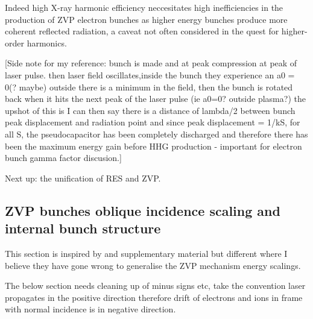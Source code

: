 Indeed high X-ray harmonic efficiency neccesitates high inefficiencies in the production of ZVP electron bunches as higher energy bunches produce more coherent reflected radiation, a caveat not often considered in the quest for higher-order harmonics.


[Side note for my reference: bunch is made and at peak compression at peak of laser pulse. then laser field oscillates,inside the bunch they experience an a0 = 0(? maybe) outside there is a minimum in the field, then the bunch is rotated back when it hits the next peak of the laser pulse (ie a0=0? outside plasma?) the upshot of this is I can then say there is a distance of lambda/2 between bunch peak displacement and radiation point and since peak displacement = 1/kS, for all S, the pseudocapacitor has been completely discharged and therefore there has been the maximum energy gain before HHG production - important for electron bunch gamma factor discusion.]


Next up: the unification of RES and ZVP.

\subsection{ZVP bunches oblique incidence scaling and internal bunch structure}
This section is inspired by \cite{gonoskovUltrarelativisticNanoplasmonicsRoute2011} and \cite{vincentiOpticalPropertiesRelativistic2014} supplementary material but different where I believe they have gone wrong to generalise the \ac{ZVP} mechanism energy scalings.

The below section needs cleaning up of minus signs etc, take the convention laser propagates in the positive direction therefore drift of electrons and ions in frame with normal incidence is in negative direction.

